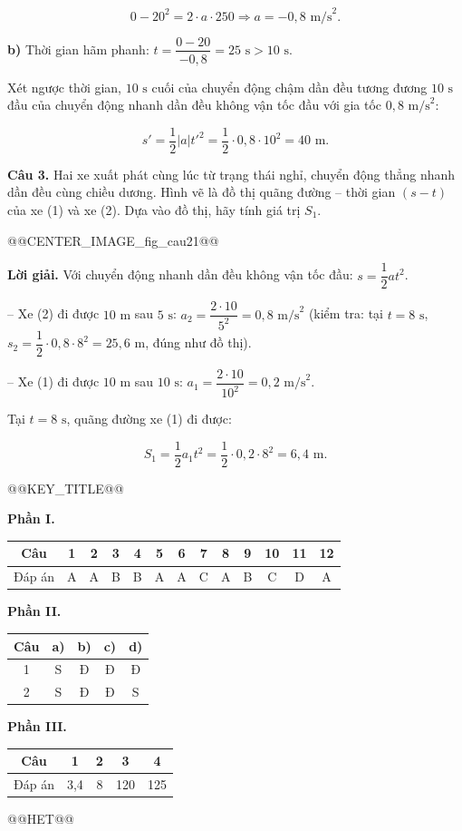 \documentclass{article}
\begin{document}
\[0 - 20^2 = 2 \cdot a \cdot 250 \Rightarrow a = -0{,}8\text{ m/s}^2.\]

\textbf{b)} Thời gian hãm phanh: $t = \dfrac{0 - 20}{-0{,}8} = 25\text{ s} > 10\text{ s}$.

Xét ngược thời gian, $10\text{ s}$ cuối của chuyển động chậm dần đều tương đương $10\text{ s}$ đầu của chuyển động nhanh dần đều không vận tốc đầu với gia tốc $0{,}8\text{ m/s}^2$:

\[s' = \frac{1}{2}|a|t'^2 = \frac{1}{2} \cdot 0{,}8 \cdot 10^2 = 40\text{ m}.\]

\textbf{Câu 3.} Hai xe xuất phát cùng lúc từ trạng thái nghỉ, chuyển động thẳng nhanh dần đều cùng chiều dương. Hình vẽ là đồ thị quãng đường -- thời gian $(s - t)$ của xe (1) và xe (2). Dựa vào đồ thị, hãy tính giá trị $S_1$.

@@CENTER_IMAGE_fig_cau21@@

\textbf{Lời giải.} Với chuyển động nhanh dần đều không vận tốc đầu: $s = \dfrac{1}{2}at^2$.

-- Xe (2) đi được $10\text{ m}$ sau $5\text{ s}$: $a_2 = \dfrac{2 \cdot 10}{5^2} = 0{,}8\text{ m/s}^2$ (kiểm tra: tại $t = 8\text{ s}$, $s_2 = \dfrac{1}{2} \cdot 0{,}8 \cdot 8^2 = 25{,}6\text{ m}$, đúng như đồ thị).

-- Xe (1) đi được $10\text{ m}$ sau $10\text{ s}$: $a_1 = \dfrac{2 \cdot 10}{10^2} = 0{,}2\text{ m/s}^2$.

Tại $t = 8\text{ s}$, quãng đường xe (1) đi được:

\[S_1 = \frac{1}{2}a_1t^2 = \frac{1}{2} \cdot 0{,}2 \cdot 8^2 = 6{,}4\text{ m}.\]



@@KEY_TITLE@@

\textbf{Phần I.}

\begin{tabular}{|c|c|c|c|c|c|c|c|c|c|c|c|c|}\hline
Câu & 1 & 2 & 3 & 4 & 5 & 6 & 7 & 8 & 9 & 10 & 11 & 12 \\ \hline
Đáp án & A & A & B & B & A & A & C & A & B & C & D & A \\ \hline
\end{tabular}

\textbf{Phần II.}

\begin{tabular}{|c|c|c|c|c|}\hline
Câu & a) & b) & c) & d) \\ \hline
1 & S & Đ & Đ & Đ \\ \hline
2 & S & Đ & Đ & S \\ \hline
\end{tabular}

\textbf{Phần III.}

\begin{tabular}{|c|c|c|c|c|}\hline
Câu & 1 & 2 & 3 & 4 \\ \hline
Đáp án & 3,4 & 8 & 120 & 125 \\ \hline
\end{tabular}



@@HET@@
\end{document}
